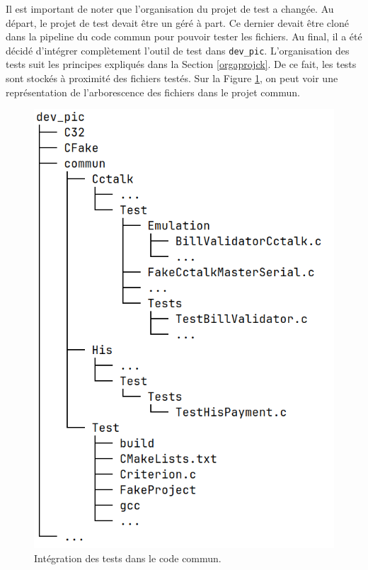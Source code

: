 \documentclass[a4paper]{article}
\begin{document}
Il est important de noter que l'organisation du projet de test a changée. Au
départ, le projet de test devait être un géré à part. Ce dernier devait être
cloné dans la pipeline du code commun pour pouvoir tester les fichiers. Au
final, il a été décidé d'intégrer complètement l'outil de test dans
\verb|dev_pic|. L'organisation des tests suit les principes expliqués dans la
Section \ref{orgaprojck}. De ce fait, les tests sont stockés à proximité des
fichiers testés. Sur la Figure \ref{fig:integrtestcommun}, on peut voir une
représentation de l'arborescence des fichiers dans le projet commun.


\begin{figure}[h!]
  \begin{center}
    \includegraphics[scale=0.4]{./img/arborescence-commun.png}
    \caption{Intégration des tests dans le code commun.}
    \label{fig:integrtestcommun}
  \end{center}
\end{figure}
\end{document}
